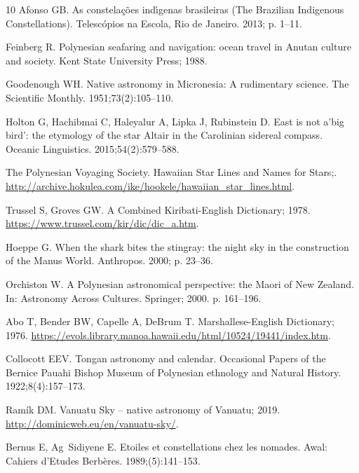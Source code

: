 \documentclass[10pt]{article}
\begin{document}
{\begin{thebibliography}{10}
Afonso GB.
\newblock As constela{\c{c}}{\~o}es ind{\'\i}genas brasileiras ({T}he
  {B}razilian Indigenous Constellations).
\newblock Telesc{\'o}pios na Escola, Rio de Janeiro. 2013; p. 1--11.

Feinberg R.
\newblock Polynesian seafaring and navigation: ocean travel in Anutan culture
  and society.
\newblock Kent State University Press; 1988.

Goodenough WH.
\newblock Native astronomy in {Micronesia}: A rudimentary science.
\newblock The {Scientific Monthly}. 1951;73(2):105--110.

Holton G, Hachibmai C, Haleyalur A, Lipka J, Rubinstein D.
\newblock East is not a'big bird': the etymology of the star {Altair} in the
  {Carolinian} sidereal compass.
\newblock Oceanic Linguistics. 2015;54(2):579--588.

{The Polynesian Voyaging Society}. Hawaiian Star Lines and Names for Stars;.
\newblock
  \url{http://archive.hokulea.com/ike/hookele/hawaiian_star_lines.html}.

Trussel S, Groves GW. A Combined {Kiribati-English} Dictionary; 1978.
\newblock \url{https://www.trussel.com/kir/dic/dic_a.htm}.

Hoeppe G.
\newblock When the shark bites the stingray: the night sky in the construction
  of the {Manus} World.
\newblock Anthropos. 2000; p. 23--36.

Orchiston W.
\newblock A {P}olynesian astronomical perspective: the {M}aori of {New
  Zealand}.
\newblock In: Astronomy Across Cultures. Springer; 2000. p. 161--196.

Abo T, Bender BW, Capelle A, DeBrum T. {Marshallese-English} Dictionary; 1976.
\newblock
  \url{https://evols.library.manoa.hawaii.edu/html/10524/19441/index.htm}.

Collocott EEV.
\newblock Tongan astronomy and calendar.
\newblock Occasional Papers of the Bernice Pauahi Bishop Museum of Polynesian
  ethnology and Natural History. 1922;8(4):157--173.

Ram{\'i}k DM. Vanuatu Sky -- native astronomy of {V}anuatu; 2019.
\newblock \url{http://dominicweb.eu/en/vanuatu-sky/}.

Bernus E, Ag~Sidiyene E.
\newblock Etoiles et constellations chez les nomades.
\newblock Awal: Cahiers d'Etudes Berb{\`e}res. 1989;(5):141--153.


\end{thebibliography}}
\end{document}
